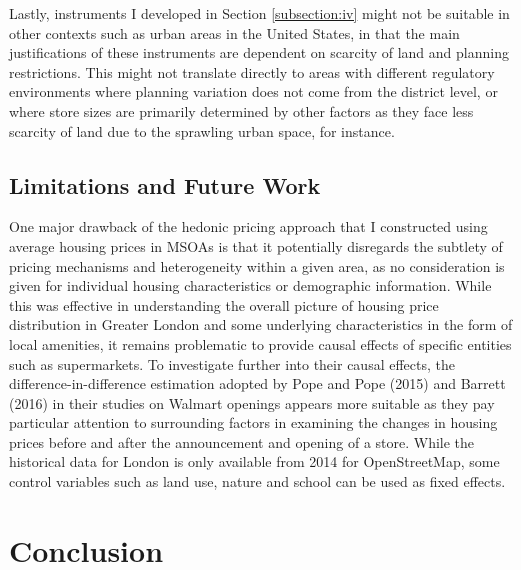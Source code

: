 \documentclass{article}
\begin{document}
Lastly, instruments I developed in Section \ref{subsection:iv} might not be suitable in other contexts such as urban areas in the United States, in that the main justifications of these instruments are dependent on scarcity of land and planning restrictions. This might not translate directly to areas with different regulatory environments where planning variation does not come from the district level, or where store sizes are primarily determined by other factors as they face less scarcity of land due to the sprawling urban space, for instance.

\subsection{Limitations and Future Work}  \label{subsection:limitations}

One major drawback of the hedonic pricing approach that I constructed using average housing prices in MSOAs is that it potentially disregards the subtlety of pricing mechanisms and heterogeneity within a given area, as no consideration is given for individual housing characteristics or demographic information. While this was effective in understanding the overall picture of housing price distribution in Greater London and some underlying characteristics in the form of local amenities, it remains problematic to provide causal effects of specific entities such as supermarkets. To investigate further into their causal effects, the difference-in-difference estimation adopted by Pope and Pope (2015) and Barrett (2016) in their studies on Walmart openings appears more suitable as they pay particular attention to surrounding factors in examining the changes in housing prices before and after the announcement and opening of a store. While the historical data for London is only available from 2014 for OpenStreetMap, some control variables such as land use, nature and school can be used as fixed effects.




\section{Conclusion} \label{section:conclusion}


\newpage
\nocite{*}
\renewcommand\harvardyearleft{\unskip, }
\renewcommand\harvardyearright[1]{.}
\let\oldthebibliography\thebibliography
\renewcommand\thebibliography{\let\bf\relax\oldthebibliography}
\renewcommand{\refname}{\textbf{Bibliography}}
  

\end{document}
